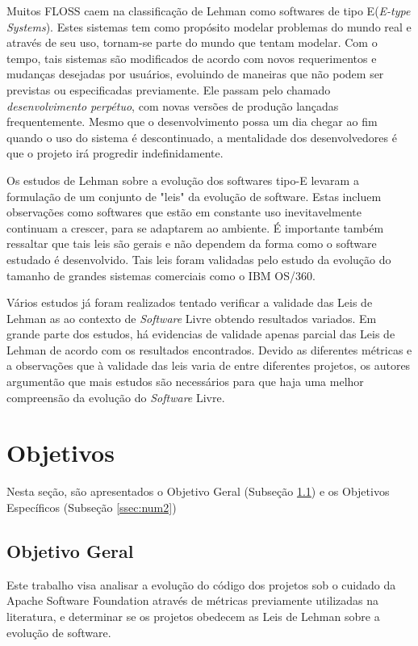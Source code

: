 Muitos FLOSS caem na classificação de Lehman\cite{belady1976model} como softwares de tipo E\cite{}(\textit{E-type Systems}). Estes sistemas tem como propósito modelar problemas do mundo real e através de seu uso, tornam-se parte do mundo que tentam modelar. Com o tempo, tais sistemas são modificados de acordo com novos requerimentos e mudanças desejadas por usuários, evoluindo de maneiras que não podem ser previstas ou especificadas previamente. Ele passam pelo chamado \textit{desenvolvimento perpétuo}, com novas versões de produção lançadas frequentemente. Mesmo que o desenvolvimento possa um dia chegar ao fim quando o uso do sistema é descontinuado, a mentalidade dos desenvolvedores é que o projeto irá progredir indefinidamente.

Os estudos de Lehman sobre a evolução dos softwares tipo-E levaram a formulação de um conjunto de "leis" da evolução de software. Estas incluem observações como softwares que estão em constante uso inevitavelmente continuam a crescer, para se adaptarem ao ambiente. É importante também ressaltar que tais leis são gerais e não dependem da forma como o software estudado é desenvolvido. Tais leis foram validadas pelo estudo da evolução do tamanho de grandes sistemas comerciais como o IBM OS/360. 

Vários estudos já foram realizados tentado verificar a validade das Leis de Lehman as ao contexto de \textit{Software} Livre obtendo resultados variados. Em grande parte dos estudos, há evidencias de validade apenas parcial das Leis de Lehman de acordo com os resultados encontrados. Devido as diferentes métricas e a observações que à validade das leis varia de entre diferentes projetos, os autores argumentão que mais estudos são necessários para que haja uma melhor compreensão da evolução do \textit{Software} Livre.


\section{Objetivos}

Nesta seção, são apresentados o Objetivo Geral (Subseção \ref{ssec:num1}) e os Objetivos Específicos (Subseção \ref{ssec:num2})
\subsection{Objetivo Geral} \label{ssec:num1}
Este trabalho visa analisar a evolução do código dos projetos sob o cuidado da Apache Software Foundation através de métricas previamente utilizadas na literatura, e determinar se os projetos obedecem as Leis de Lehman sobre a evolução de software.

